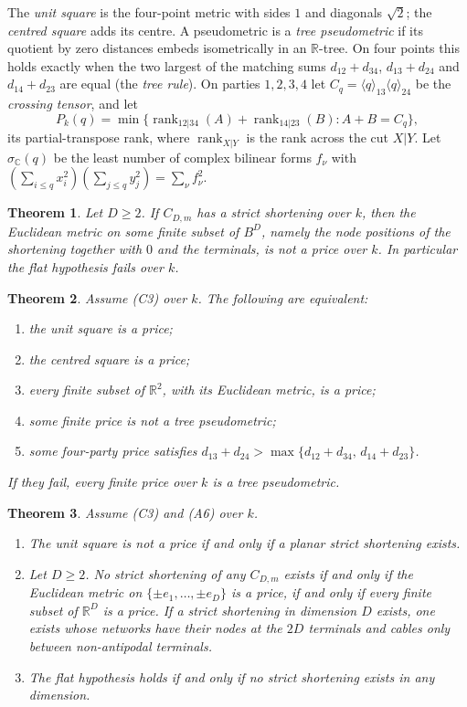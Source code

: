 \documentclass[11pt,a4paper]{article}
\newtheorem{theorem}{Theorem}
\theoremstyle{definition}
\newcommand{\R}{\mathbb{R}}
\newcommand{\C}{\mathbb{C}}
\newcommand{\kk}{k}
\newcommand{\rk}{\operatorname{rank}}
\newcommand{\wire}[2]{\langle #1\rangle_{#2}}
\newcommand{\CS}{\textup{C3}}
\newcommand{\AS}{\textup{A6}}
\begin{document}
The \emph{unit square} is the four-point metric with sides $1$ and diagonals
$\sqrt2$; the \emph{centred square} adds its centre. A pseudometric is a
\emph{tree pseudometric} if its quotient by zero distances embeds isometrically in
an $\R$-tree. On four points this holds exactly when the two largest of the
matching sums $d_{12}+d_{34}$, $d_{13}+d_{24}$ and $d_{14}+d_{23}$ are equal (the
\emph{tree rule}). On parties $1,2,3,4$ let $C_q=\wire{q}{13}\wire{q}{24}$ be the
\emph{crossing tensor}, and let
\[
P_\kk(q)=\min\{\rk_{12|34}(A)+\rk_{14|23}(B): A+B=C_q\},
\]
its partial-transpose rank, where $\rk_{X|Y}$ is the rank across the cut $X|Y$.
Let $\sigma_\C(q)$ be the least number of complex bilinear forms $f_\nu$ with
$(\sum_{i\le q}x_i^2)(\sum_{j\le q}y_j^2)=\sum_\nu f_\nu^2$.

\begin{theorem}\label{thm:A}
Let $D\ge2$. If $C_{D,m}$ has a strict shortening over $\kk$, then the Euclidean
metric on some finite subset of $B^D$, namely the node positions of the
shortening together with $0$ and the terminals, is not a price over $\kk$. In
particular the flat hypothesis fails over $\kk$.
\end{theorem}

\begin{theorem}\label{thm:B}
Assume (\CS) over $\kk$. The following are equivalent:
\begin{enumerate}
\item[(1)] the unit square is a price;
\item[(2)] the centred square is a price;
\item[(3)] every finite subset of $\R^2$, with its Euclidean metric, is a price;
\item[(4)] some finite price is not a tree pseudometric;
\item[(5)] some four-party price satisfies
$d_{13}+d_{24}>\max\{d_{12}+d_{34},\,d_{14}+d_{23}\}$.
\end{enumerate}
If they fail, every finite price over $\kk$ is a tree pseudometric.
\end{theorem}

\begin{theorem}\label{thm:C}
Assume (\CS) and (\AS) over $\kk$.
\begin{enumerate}
\item[(i)] The unit square is not a price if and only if a planar strict
shortening exists.
\item[(ii)] Let $D\ge2$. No strict shortening of any $C_{D,m}$ exists if and only
if the Euclidean metric on $\{\pm e_1,\dots,\pm e_D\}$ is a price, if and only if
every finite subset of $\R^D$ is a price. If a strict shortening in dimension
$D$ exists, one exists whose networks have their nodes at the $2D$ terminals and
cables only between non-antipodal terminals.
\item[(iii)] The flat hypothesis holds if and only if no strict shortening exists
in any dimension.
\end{enumerate}
\end{theorem}
\end{document}
